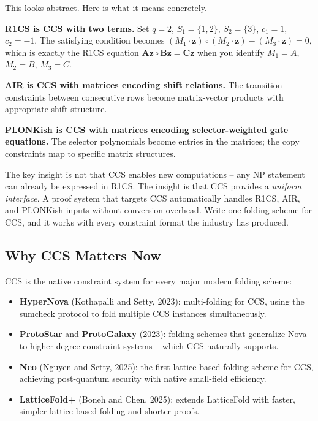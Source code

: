 \documentclass[
  11pt,
  openany]{report}
\providecommand{\tightlist}{%
  \setlength{\itemsep}{0pt}\setlength{\parskip}{0pt}}
\renewcommand{\textbf}[1]{{\bfseries\color{MidnightBold}#1}}
\begin{document}
This looks abstract. Here is what it means concretely.

\textbf{R1CS is CCS with two terms.} Set \(q = 2\), \(S_1 = \{1, 2\}\),
\(S_2 = \{3\}\), \(c_1 = 1\), \(c_2 = -1\). The satisfying condition becomes
\((M_1 \cdot \mathbf{z}) \circ (M_2 \cdot \mathbf{z}) - (M_3 \cdot \mathbf{z}) = 0\),
which is exactly the R1CS equation
\(\mathbf{A}\mathbf{z} \circ \mathbf{B}\mathbf{z} = \mathbf{C}\mathbf{z}\) when
you identify \(M_1 = A\), \(M_2 = B\), \(M_3 = C\).

\textbf{AIR is CCS with matrices encoding shift relations.} The transition
constraints between consecutive rows become matrix-vector products with
appropriate shift structure.

\textbf{PLONKish is CCS with matrices encoding selector-weighted gate
equations.} The selector polynomials become entries in the matrices; the copy
constraints map to specific matrix structures.

The key insight is not that CCS enables new computations -- any NP statement can
already be expressed in R1CS. The insight is that CCS provides a \emph{uniform
interface}. A proof system that targets CCS automatically handles R1CS, AIR, and
PLONKish inputs without conversion overhead. Write one folding scheme for CCS,
and it works with every constraint format the industry has produced.

\subsection{Why CCS Matters Now}\label{why-ccs-matters-now}

CCS is the native constraint system for every major modern folding scheme:

\begin{itemize}
\tightlist
\item
  \textbf{HyperNova} (Kothapalli and Setty, 2023): multi-folding for CCS, using
  the sumcheck protocol to fold multiple CCS instances simultaneously.
\item
  \textbf{ProtoStar} and \textbf{ProtoGalaxy} (2023): folding schemes that
  generalize Nova to higher-degree constraint systems -- which CCS naturally
  supports.
\item
  \textbf{Neo} (Nguyen and Setty, 2025): the first lattice-based folding scheme
  for CCS, achieving post-quantum security with native small-field efficiency.
\item
  \textbf{LatticeFold+} (Boneh and Chen, 2025): extends LatticeFold with faster,
  simpler lattice-based folding and shorter proofs.
\end{itemize}
\end{document}
